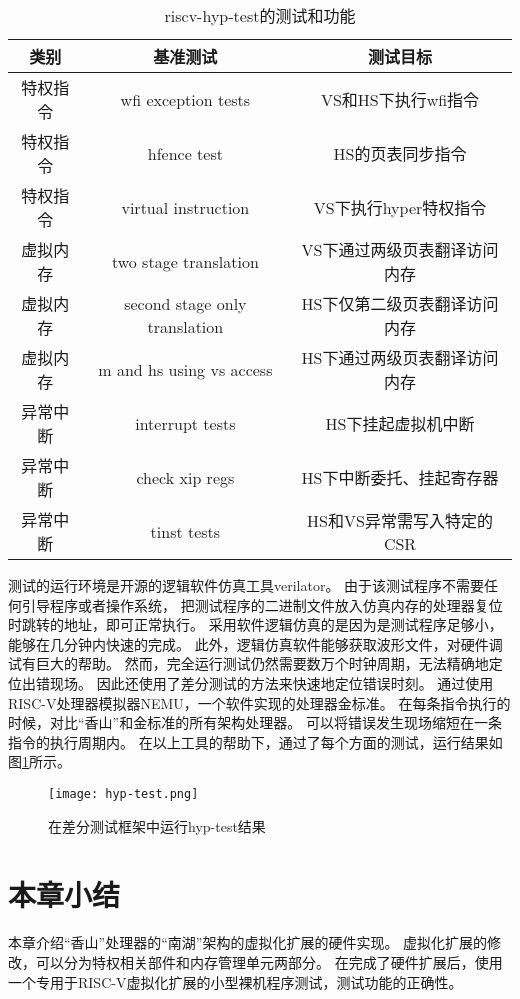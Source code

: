 \begin{table}
    \centering
    \caption{riscv-hyp-test的测试和功能}
    \begin{tabular}{ccc}
        \toprule
        类别   & 基准测试                          & 测试目标             \\
        \midrule
        特权指令 & wfi exception tests           & VS和HS下执行wfi指令    \\
        特权指令 & hfence test                   & HS的页表同步指令        \\
        特权指令 & virtual instruction           & VS下执行hyper特权指令   \\
        虚拟内存 & two stage translation         & VS下通过两级页表翻译访问内存  \\
        虚拟内存 & second stage only translation & HS下仅第二级页表翻译访问内存  \\
        虚拟内存 & m and hs using vs access      & HS下通过两级页表翻译访问内存  \\
        异常中断 & interrupt tests               & HS下挂起虚拟机中断       \\
        异常中断 & check xip regs                & HS下中断委托、挂起寄存器    \\
        异常中断 & tinst tests                   & HS和VS异常需写入特定的CSR \\
        \bottomrule
    \end{tabular}
    \label{tab:hyp-test}
\end{table}

测试的运行环境是开源的逻辑软件仿真工具verilator。
由于该测试程序不需要任何引导程序或者操作系统，
把测试程序的二进制文件放入仿真内存的处理器复位时跳转的地址，即可正常执行。
采用软件逻辑仿真的是因为是测试程序足够小，能够在几分钟内快速的完成。
此外，逻辑仿真软件能够获取波形文件，对硬件调试有巨大的帮助。
然而，完全运行测试仍然需要数万个时钟周期，无法精确地定位出错现场。
因此还使用了差分测试的方法来快速地定位错误时刻。
通过使用RISC-V处理器模拟器NEMU，一个软件实现的处理器金标准。
在每条指令执行的时候，对比“香山”和金标准的所有架构处理器。
可以将错误发生现场缩短在一条指令的执行周期内。
在以上工具的帮助下，通过了每个方面的测试，运行结果如图\ref{fig:hyp-test}所示。

\begin{figure}[htbp]
    \centering
    \texttt{[image: hyp-test.png]}
    \caption{在差分测试框架中运行hyp-test结果}
    \label{fig:hyp-test}
\end{figure}

\section{本章小结}
本章介绍“香山”处理器的“南湖”架构的虚拟化扩展的硬件实现。
虚拟化扩展的修改，可以分为特权相关部件和内存管理单元两部分。
在完成了硬件扩展后，使用一个专用于RISC-V虚拟化扩展的小型裸机程序测试，测试功能的正确性。